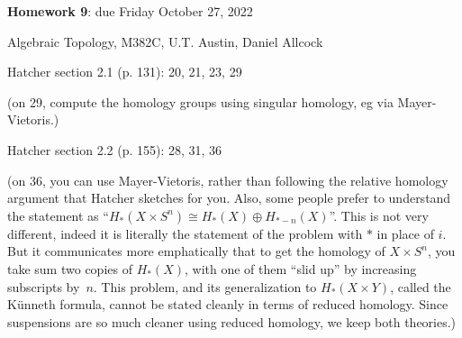 \documentclass{amsart}
\theoremstyle{remark}
\let\iso\cong
\begin{document}
{\bf Homework 9}: due Friday October 27, 2022

Algebraic Topology, M382C, U.T. Austin, Daniel Allcock

\bigskip
Hatcher section 2.1 (p. 131):
20, 21, 23, 29

(on 29, compute the homology groups using singular
homology, eg via Mayer-Vietoris.)

Hatcher section 2.2 (p. 155):
28, 31, 36

(on 36, you can use Mayer-Vietoris, rather than following
the relative homology argument that Hatcher sketches for you.
Also, some people prefer to 
understand the statement as
``$H_*(X\times S^n)\iso H_*(X)\oplus H_{*-n}(X)$''.
This is not very different, indeed it is 
literally the statement of the problem with $*$ in place
of $i$.  But it communicates more emphatically that to get the
homology of $X\times S^n$, you take sum two copies of $H_*(X)$,
with one of them ``slid up'' by increasing subscripts by~$n$.
This problem, and its generalization to $H_*(X\times Y)$, called the
K\"unneth formula,
cannot be stated cleanly in terms of reduced homology. 
Since suspensions are so much cleaner using reduced homology,
we keep both theories.)
\end{document}
